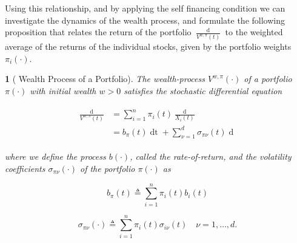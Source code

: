 \documentclass[british]{amsart} \usepackage{lmodern}
\numberwithin{equation}{section} \numberwithin{figure}{section}
\theoremstyle{plain} \newtheorem{thm}{\protect\theoremname}[section]
\theoremstyle{definition} \newtheorem{defn}[thm]{\protect\definitionname}
\theoremstyle{plain} \newtheorem{assumption}[thm]{\protect\assumptionname}
\theoremstyle{plain} \newtheorem{lem}[thm]{\protect\lemmaname}
\theoremstyle{plain} \newtheorem{prop}[thm]{\protect\propositionname}
\theoremstyle{remark} \newtheorem{rem}[thm]{\protect\remarkname}
\theoremstyle{plain} \newtheorem{cor}[thm]{\protect\corollaryname}
\renewcommand{\d}[1]{\mathop{\mathrm{d}{#1}}}
\newcommand{\defeq}{\mathop{\triangleq}} \newcommand{\almostsurely}{\text{a.s.}}
\newcommand{\V}{V^{w,\pi}}
\begin{document}
Using this relationship, and by applying the self financing condition we can
investigate the dynamics of the wealth process, and formulate the following
proposition that relates the return of the portfolio $\frac{\d{\V(t)}}{\V(t)}$
to the weighted average of the returns of the individual stocks, given by the
portfolio weights $\pi_{i}(\cdot)$.

\begin{prop} [{\cite[Equation 2.2]{fernholz2009}} Wealth Process of a Portfolio]

  The wealth-process $V^{w,\pi}(\cdot)$ of a portfolio $\pi(\cdot)$
  with initial wealth $w > 0$ satisfies the stochastic differential equation

  \begin{gather}
    \label{eq:arithmeticreturnofportfolio}
    \begin{split}
      \frac{\d{V^{w,\pi}(t)}}{V^{w,\pi}(t)} 
        &= \sum_{i=1}^{n} \pi_{i}(t) \frac{\d{X_{i}(t)}}{X_{i}(t)} \\
        &= b_{\pi}(t)\d{t} + \sum_{\nu=1}^{d} \sigma_{\pi\nu}(t) \d{W_{\nu}(t)}
    \end{split}
  \end{gather}

  where we define the process $b(\cdot)$, called the \textit{rate-of-return}, and the
  volatility coefficients $\sigma_{\pi\nu}(\cdot)$ of the portfolio $\pi(\cdot)$ 
  as

  \begin{equation}
    \label{eq:wealthprocessrateofreturn}
    b_{\pi}(t) \defeq \sum_{i=1}^{n} \pi_{i}(t) b_{i}(t)
  \end{equation}

  \begin{equation}
    \label{eq:wealthprocessvolatility}
    \sigma_{\pi\nu}(\cdot) \defeq \sum_{i=1}^{n} \pi_{i}(t) \sigma_{i\nu}(t)
    \quad \nu=1,\dots,d.
  \end{equation}

\end{prop}
\end{document}
